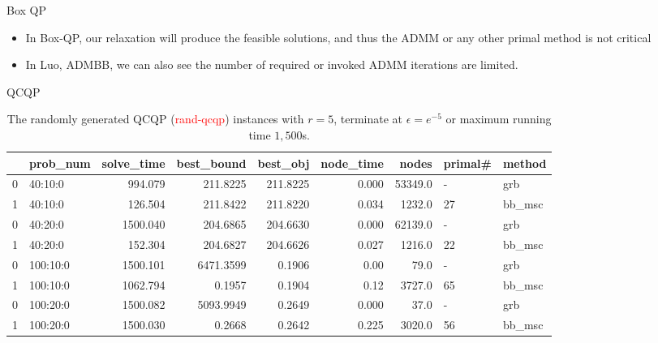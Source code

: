 \documentclass[aspectratio=1610, 9pt]{beamer}
\newcommand{\redsf}[1]{\textcolor{red}{\textsf{#1}}}
\begin{document}
\begin{frame}[allowframebreaks]{Box QP}
\begin{table}[h!]
    \framebreak

    \begin{itemize}
      \item In Box-QP, our relaxation will produce the feasible solutions, and thus the ADMM or any other primal method is not critical
      \item In \textsf{Luo, ADMBB}, we can also see the number of required or invoked ADMM iterations are limited.
    \end{itemize}
  \end{table}
  \normalsize

\end{frame}
\setlength\pdfpagewidth{16.00cm}%
\setlength\pdfpageheight{20.00cm}%
\begin{frame}[standout]{QCQP}

  \small
  \begin{table}[h!]
    \centering
    \begin{tabular}{llrrrrrll}
      \toprule
      {} & prob\_num & solve\_time & best\_bound & best\_obj & node\_time & nodes   & primal\# & method  \\
      \midrule
      0  & 40:10:0   & 994.079     & 211.8225    & 211.8225  & 0.000      & 53349.0 & -        & grb     \\
      1  & 40:10:0   & 126.504     & 211.8422    & 211.8220  & 0.034      & 1232.0  & 27       & bb\_msc \\
      0  & 40:20:0   & 1500.040    & 204.6865    & 204.6630  & 0.000      & 62139.0 & -        & grb     \\
      1  & 40:20:0   & 152.304     & 204.6827    & 204.6626  & 0.027      & 1216.0  & 22       & bb\_msc \\
      0  & 100:10:0  & 1500.101    & 6471.3599   & 0.1906    & 0.00       & 79.0    & -        & grb     \\
      1  & 100:10:0  & 1062.794    & 0.1957      & 0.1904    & 0.12       & 3727.0  & 65       & bb\_msc \\
      0  & 100:20:0  & 1500.082    & 5093.9949   & 0.2649    & 0.000      & 37.0    & -        & grb     \\
      1  & 100:20:0  & 1500.030    & 0.2668      & 0.2642    & 0.225      & 3020.0  & 56       & bb\_msc \\
      \bottomrule
    \end{tabular}
    \caption{The randomly generated QCQP (\redsf{rand-qcqp}) instances with \(r = 5\), terminate at \(\epsilon = e^{-5}\) or maximum running time \(1,500\)s. }
  \end{table}


\end{frame}
\end{document}
